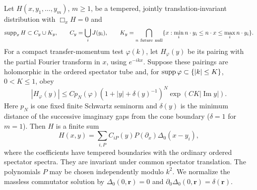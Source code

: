 \begin{lemma}
\label{C:homogeneous-defect}
Let $H(x,y_1,\ldots,y_m)$, $m\ge1$, be a tempered, jointly
translation-invariant distribution with $\Box_xH=0$ and
\begin{equation}\label{C:H-support}
 \operatorname{supp}_x H\subset C_y\cup K_y,\qquad
 C_y=\bigcup_iJ(y_i),\qquad
 K_y=\bigcap_{n\ {\mathrm{future\ null}}}
 \{x:\min_i n\cdot y_i\le n\cdot x\le\max_i n\cdot y_i\}.
\end{equation}
For a compact transfer-momentum test $\varphi(k)$, let $H_\varphi(y)$
be its pairing with the partial Fourier transform in $x$, using
$e^{-ikx}$. Suppose these pairings are holomorphic in the ordered
spectator tube and, for $\operatorname{supp}\varphi\subset\{|k|\le K\}$, $0<K\le1$,
obey
\begin{equation}\label{C:shifted-test-bound}
 |H_\varphi(y)|\le C p_N(\varphi)
 (1+|y|+\delta(y)^{-1})^N
 \exp(CK|\operatorname{Im}y|).
\end{equation}
Here $p_N$ is one fixed finite Schwartz seminorm and $\delta(y)$ is the minimum
distance of the successive imaginary gaps from the cone boundary
($\delta=1$ for $m=1$). Then $H$ is a finite sum
\[
 H(x,y)=\sum_{i,P}C_{iP}(y)P(\partial_x)\Delta_0(x-y_i),
\]
where the coefficients have tempered boundaries with the ordinary
ordered spectator spectra. They are invariant under common spectator
translation. The polynomials $P$ may be chosen independently modulo
$k^2$. We normalize the massless commutator solution by
$\Delta_0(0,\boldsymbol r)=0$ and
$\partial_0\Delta_0(0,\boldsymbol r)=\delta(\boldsymbol r)$.
\end{lemma}

